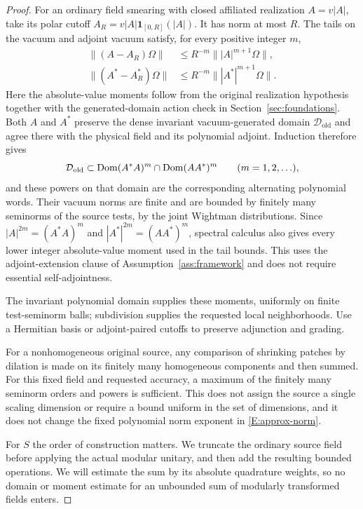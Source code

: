 \begin{proof}
For an ordinary field smearing with closed affiliated realization
$A=v|A|$, take its polar cutoff $A_R=v|A|\mathbf1_{[0,R]}(|A|)$.
It has norm at most $R$.  The tails on the vacuum and adjoint vacuum
satisfy, for every positive integer $m$,
\begin{align*}
 \|(A-A_R)\Omega\|&\leq R^{-m}\||A|^{m+1}\Omega\|,\\
 \|(A^*-A_R^*)\Omega\|&\leq R^{-m}\||A^*|^{m+1}\Omega\|.
\end{align*}
Here the absolute-value moments follow from the original realization
hypothesis together with the generated-domain action check in
Section~\ref{sec:foundations}. Both $A$ and $A^*$ preserve the dense
invariant vacuum-generated domain $\mathcal D_{\mathrm{old}}$ and agree
there with the physical field and its polynomial adjoint. Induction
therefore gives
\[
 \mathcal D_{\mathrm{old}}\subset
 \operatorname{Dom} (A^*A)^m\cap\operatorname{Dom}(AA^*)^m
 \qquad(m=1,2,\ldots),
\]
and these powers on that domain are the corresponding alternating
polynomial words.  Their vacuum norms are finite and are bounded by
finitely many seminorms of the source tests, by the joint Wightman
distributions.  Since $|A|^{2m}=(A^*A)^m$ and
$|A^*|^{2m}=(AA^*)^m$, spectral calculus also gives every lower
integer absolute-value moment used in the tail bounds.  This uses
the adjoint-extension clause of Assumption~\ref{ass:framework} and
does not require essential self-adjointness.

The invariant polynomial domain supplies these moments, uniformly
on finite test-seminorm balls; subdivision supplies the requested
local neighborhoods.  Use a Hermitian basis or adjoint-paired
cutoffs to preserve adjunction and grading.

For a nonhomogeneous original source, any comparison of shrinking
patches by dilation is made on its finitely many homogeneous
components and then summed.  For this fixed field and requested
accuracy, a maximum of the finitely many seminorm orders and powers
is sufficient.  This does not assign the source a single scaling
dimension or require a bound uniform in the set of dimensions, and
it does not change the fixed polynomial norm exponent in
\eqref{E:approx-norm}.

For $S$ the order of construction matters.  We truncate the
ordinary source field before applying the actual modular unitary,
and then add the resulting bounded operations.  We will estimate
the sum by its absolute quadrature weights, so no domain or moment
estimate for an unbounded sum of modularly transformed fields enters.


\end{proof}
